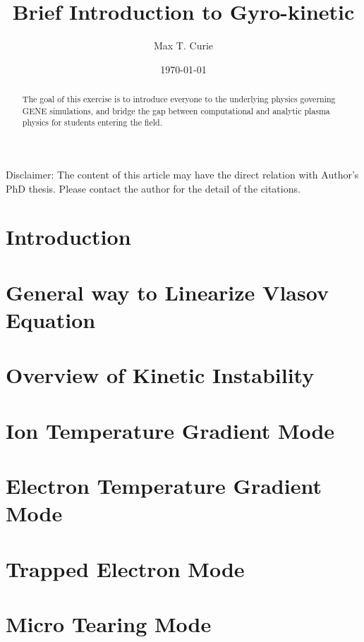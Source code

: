\documentclass[12pt]{report}
\title{Brief Introduction to Gyro-kinetic}
\author{Max T. Curie}
\date{\today}
\begin{document}
\maketitle

Disclaimer: The content of this article may have the direct relation with Author's PhD thesis. Please contact the author for the detail of the citations. 

\begin{abstract}
The goal of this exercise is to introduce everyone to the underlying physics governing GENE simulations, and bridge the gap between computational and analytic plasma physics for students entering the field. 
\end{abstract}

\tableofcontents

\chapter{Introduction}


\chapter{General way to Linearize Vlasov Equation}


\chapter{Overview of Kinetic Instability}


\chapter{Ion Temperature Gradient Mode}


\chapter{Electron Temperature Gradient Mode}


\chapter{Trapped Electron Mode}


\chapter{Micro Tearing Mode}
\label{ch:MTM}

\end{document}
